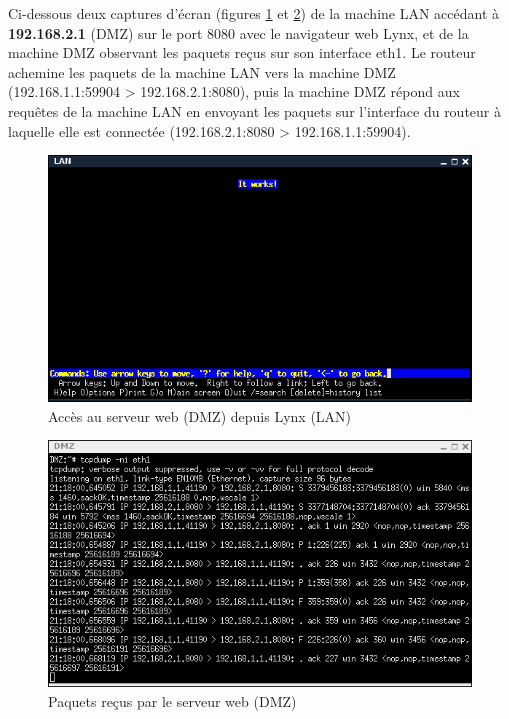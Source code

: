 \documentclass[frenchb, 11pt]{article}
\begin{document}
Ci-dessous deux captures d'écran (figures \ref{fig:sch3lan} et \ref{fig:sch3dmz}) de la machine LAN accédant à \textbf{192.168.2.1} (DMZ) sur le port 8080 avec le navigateur web Lynx, et de la machine DMZ observant les paquets reçus sur son interface eth1. Le routeur achemine les paquets de la machine LAN vers la machine DMZ (192.168.1.1:59904 > 192.168.2.1:8080), puis la machine DMZ répond aux requêtes de la machine LAN en envoyant les paquets sur l'interface du routeur à laquelle elle est connectée (192.168.2.1:8080 > 192.168.1.1:59904).

\begin{figure}[h!]
	\centering
	\includegraphics[scale=0.62]{sch3LAN.png}
	\caption{Accès au serveur web (DMZ) depuis Lynx (LAN)}
	\label{fig:sch3lan}
\end{figure}
\newpage

\begin{figure}[h!]
	\centering
	\includegraphics[scale=0.68]{sch3DMZ.png}
	\caption{Paquets reçus par le serveur web (DMZ)}
	\label{fig:sch3dmz}
\end{figure}
\newpage
\end{document}
